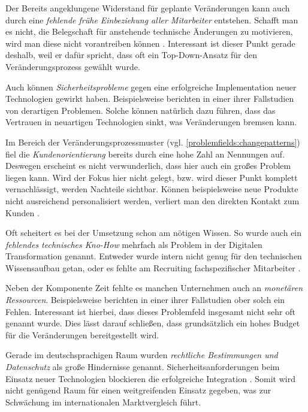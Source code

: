 Der Bereits angeklungene Widerstand für geplante Veränderungen kann auch durch eine \textit{fehlende frühe Einbeziehung aller Mitarbeiter} entstehen. Schafft man es nicht, die Belegschaft  für anstehende technische Änderungen zu motivieren, wird man diese nicht vorantreiben können \cite[S. 40]{kawohl_digitale_2016}. Interessant ist dieser Punkt gerade deshalb, weil er dafür spricht, dass oft ein Top-Down-Ansatz für den Veränderungsprozess gewählt wurde.

Auch können \textit{Sicherheitsprobleme} gegen eine erfolgreiche Implementation neuer Technologien gewirkt haben. Beispielsweise berichten  in einer ihrer Fallstudien von derartigen Problemen. Solche können natürlich dazu führen, dass das Vertrauen in neuartigen Technologien sinkt, was Veränderungen bremsen kann.

Im Bereich der Veränderungsprozessmuster (vgl. \ref{problemfields:changepatterns}) fiel die \textit{Kundenorientierung} bereits durch eine hohe Zahl an Nennungen auf. Deswegen erscheint es nicht verwunderlich, dass hier auch ein großes Problem liegen kann. Wird der Fokus hier nicht gelegt, bzw. wird dieser Punkt komplett vernachlässigt, werden Nachteile sichtbar. Können beispielsweise neue Produkte nicht ausreichend personalisiert werden, verliert man den direkten Kontakt zum Kunden \cite[S. 20]{kremins_2018_2018}.

Oft scheitert es bei der Umsetzung schon am nötigen Wissen. So wurde auch ein \textit{fehlendes technisches Kno-How} mehrfach als Problem in der Digitalen Transformation genannt. Entweder wurde intern nicht genug für den technischen Wissensaufbau getan, oder es fehlte am Recruiting fachspezifischer Mitarbeiter \cite[S. 37]{kawohl_digitale_2016}.

Neben der Komponente Zeit fehlte es  manchen Unternehmen auch an \textit{monetären Ressourcen}. Beispielsweise berichten  in einer ihrer Fallstudien ober solch ein Fehlen. Interessant ist hierbei, dass dieses Problemfeld insgesamt nicht sehr oft genannt wurde. Dies lässt darauf schließen, dass grundsätzlich ein hohes Budget für die Veränderungen bereitgestellt wird.

Gerade im deutschsprachigen Raum wurden \textit{rechtliche Bestimmungen und Datenschutz} als große Hindernisse genannt. Sicherheitsanforderungen beim Einsatz neuer Technologien blockieren die erfolgreiche Integration \cite[S. 7]{depiereux_studie_2018}. Somit wird nicht genügend Raum für einen weitgreifenden Einsatz gegeben, was zur Schwächung im internationalen Marktvergleich führt.


